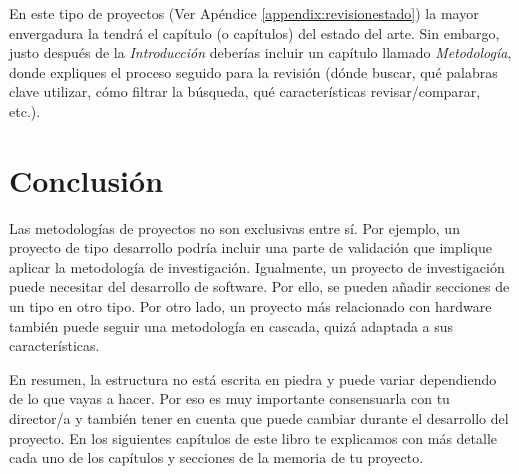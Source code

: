 En este tipo de proyectos (Ver Apéndice  \ref{appendix:revisionestado}) la mayor envergadura la tendrá el capítulo (o capítulos) del estado del arte. Sin embargo, justo después de la \textit{Introducción} deberías incluir un capítulo llamado \textit{Metodología}, donde expliques el proceso seguido para la revisión (dónde buscar, qué palabras clave utilizar, cómo filtrar la búsqueda, qué características revisar/comparar, etc.).


\section{Conclusión}

 Las metodologías de proyectos no son exclusivas entre sí.  Por ejemplo, un proyecto de tipo desarrollo podría incluir una parte de validación que implique aplicar la metodología de investigación. Igualmente, un proyecto de investigación puede necesitar del desarrollo de software. Por ello, se pueden añadir secciones de un tipo en otro tipo. Por otro lado, un proyecto más relacionado con hardware también puede seguir una metodología en cascada, quizá adaptada a sus características.

En resumen, la estructura no está escrita en piedra y puede variar dependiendo de lo que vayas a hacer. Por eso es muy importante consensuarla con tu director/a y también tener en cuenta que puede cambiar durante el desarrollo del proyecto. En los siguientes capítulos de este libro te explicamos con más detalle cada uno de los capítulos y secciones de la memoria de tu proyecto.

